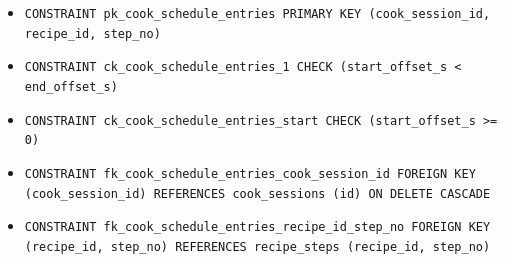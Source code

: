 \begin{itemize}
\item \raggedright {\small\texttt{CONSTRAINT pk\_\allowbreak{}\allowbreak{}cook\_\allowbreak{}\allowbreak{}schedule\_\allowbreak{}\allowbreak{}entries PRIMARY KEY (cook\_\allowbreak{}\allowbreak{}session\_\allowbreak{}\allowbreak{}id, recipe\_\allowbreak{}\allowbreak{}id, step\_\allowbreak{}\allowbreak{}no)}}
\item \raggedright {\small\texttt{CONSTRAINT ck\_\allowbreak{}\allowbreak{}cook\_\allowbreak{}\allowbreak{}schedule\_\allowbreak{}\allowbreak{}entries\_\allowbreak{}\allowbreak{}1 CHECK (start\_\allowbreak{}\allowbreak{}offset\_\allowbreak{}\allowbreak{}s < end\_\allowbreak{}\allowbreak{}offset\_\allowbreak{}\allowbreak{}s)}}
\item \raggedright {\small\texttt{CONSTRAINT ck\_\allowbreak{}\allowbreak{}cook\_\allowbreak{}\allowbreak{}schedule\_\allowbreak{}\allowbreak{}entries\_\allowbreak{}\allowbreak{}start CHECK (start\_\allowbreak{}\allowbreak{}offset\_\allowbreak{}\allowbreak{}s >= 0)}}
\item \raggedright {\small\texttt{CONSTRAINT fk\_\allowbreak{}\allowbreak{}cook\_\allowbreak{}\allowbreak{}schedule\_\allowbreak{}\allowbreak{}entries\_\allowbreak{}\allowbreak{}cook\_\allowbreak{}\allowbreak{}session\_\allowbreak{}\allowbreak{}id FOREIGN KEY (cook\_\allowbreak{}\allowbreak{}session\_\allowbreak{}\allowbreak{}id) REFERENCES cook\_\allowbreak{}\allowbreak{}sessions (id) ON DELETE CASCADE}}
\item \raggedright {\small\texttt{CONSTRAINT fk\_\allowbreak{}\allowbreak{}cook\_\allowbreak{}\allowbreak{}schedule\_\allowbreak{}\allowbreak{}entries\_\allowbreak{}\allowbreak{}recipe\_\allowbreak{}\allowbreak{}id\_\allowbreak{}\allowbreak{}step\_\allowbreak{}\allowbreak{}no FOREIGN KEY (recipe\_\allowbreak{}\allowbreak{}id, step\_\allowbreak{}\allowbreak{}no) REFERENCES recipe\_\allowbreak{}\allowbreak{}steps (recipe\_\allowbreak{}\allowbreak{}id, step\_\allowbreak{}\allowbreak{}no)}}
\end{itemize}
